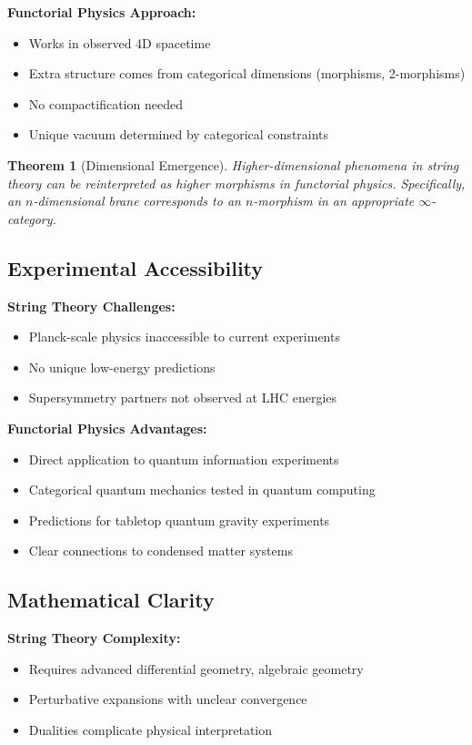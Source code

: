 \documentclass[11pt,a4paper]{article}
\newtheorem{theorem}{Theorem}
\begin{document}
\textbf{Functorial Physics Approach:}
\begin{itemize}
    \item Works in observed 4D spacetime
    \item Extra structure comes from categorical dimensions (morphisms, 2-morphisms)
    \item No compactification needed
    \item Unique vacuum determined by categorical constraints
\end{itemize}

\begin{theorem}[Dimensional Emergence]
Higher-dimensional phenomena in string theory can be reinterpreted as higher morphisms in functorial physics. Specifically, an $n$-dimensional brane corresponds to an $n$-morphism in an appropriate $\infty$-category.
\end{theorem}

\subsection{Experimental Accessibility}

\textbf{String Theory Challenges:}
\begin{itemize}
    \item Planck-scale physics inaccessible to current experiments
    \item No unique low-energy predictions
    \item Supersymmetry partners not observed at LHC energies
\end{itemize}

\textbf{Functorial Physics Advantages:}
\begin{itemize}
    \item Direct application to quantum information experiments
    \item Categorical quantum mechanics tested in quantum computing
    \item Predictions for tabletop quantum gravity experiments
    \item Clear connections to condensed matter systems
\end{itemize}

\subsection{Mathematical Clarity}

\textbf{String Theory Complexity:}
\begin{itemize}
    \item Requires advanced differential geometry, algebraic geometry
    \item Perturbative expansions with unclear convergence
    \item Dualities complicate physical interpretation
\end{itemize}
\end{document}
